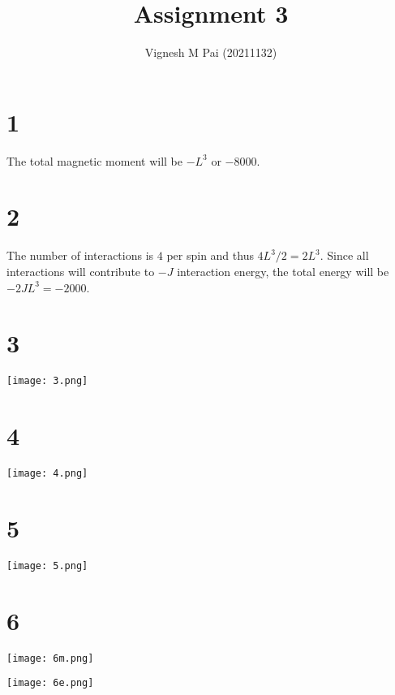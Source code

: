\documentclass{article}
\title{Assignment 3}
\author{Vignesh M Pai (20211132)}
\date{}
\begin{document}
\maketitle

\section*{1}

The total magnetic moment will be $-L^3$ or $-8000$.

\section*{2}

The number of interactions is $4$ per spin and thus $4L^3 / 2 = 2 L^3$.
Since all interactions will contribute to $-J$ interaction energy, the total energy will be $-2 J L^3 = -2000$.

\section*{3}

\begin{center}
    \texttt{[image: 3.png]}
\end{center}

\section*{4}

\begin{center}
    \texttt{[image: 4.png]}
\end{center}

\section*{5}

\begin{center}
    \texttt{[image: 5.png]}
\end{center}

\section*{6}

\begin{center}
    \texttt{[image: 6m.png]}
\end{center}

\begin{center}
    \texttt{[image: 6e.png]}
\end{center}
\end{document}
